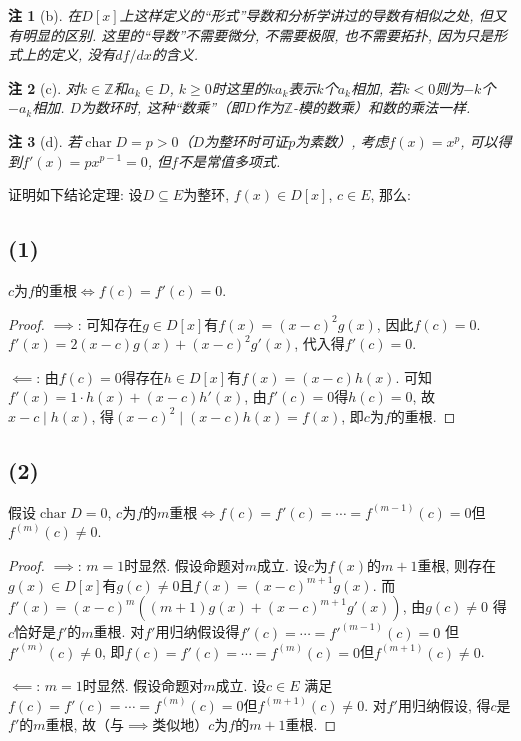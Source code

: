 \documentclass[12pt, a4paper, fontset=windows]{ctexart}
\newcommand{\Z}{\mathbb{Z}}
\newcommand{\ch}{\operatorname{char}}
\newcommand{\kh}[1]{（{#1}）} %
\newcommand{\yh}[1]{“{#1}”} %
\newtheorem*{remark}{注}
\begin{document}
\begin{remark}[b]
在$D[x]$上这样定义的\yh{形式}导数和分析学讲过的导数有相似之处, 
但又有明显的区别. 这里的\yh{导数}不需要微分, 不需要极限, 
也不需要拓扑, 因为只是形式上的定义, 没有$df/dx$的含义. 
\end{remark}

\begin{remark}[c]
对$k\in\Z$和$a_k\in D$, $k\ge 0$时这里的$ka_k$表示$k$个$a_k$相加, 
若$k<0$则为$-k$个$-a_k$相加. $D$为数环时, 这种\yh{数乘}\kh{即$D$作为$\Z$-模的数乘}和数的乘法一样. 
\end{remark}

\begin{remark}[d]
若$\ch D=p>0$\kh{$D$为整环时可证$p$为素数}, 
考虑$f(x)=x^p$, 可以得到$f'(x)=px^{p-1}=0$, 但$f$不是常值多项式. 
\end{remark}

\vspace{2em}

证明如下结论定理: 设$D\subseteq E$为整环, $f(x)\in D[x]$, 
$c\in E$, 那么: 
\subsection*{(1)}

$c$为$f$的重根$\iff f(c)=f'(c)=0$. 

\begin{proof}
$\implies$: 可知存在$g\in D[x]$有$f(x)=(x-c)^2g(x)$, 
因此$f(c)=0$. $f'(x)=2(x-c)g(x)+(x-c)^2g'(x)$, 代入得$f'(c)=0$. 

$\impliedby$: 由$f(c)=0$得存在$h\in D[x]$有$f(x)=(x-c)h(x)$. 
可知$f'(x)=1\cdot h(x)+(x-c)h'(x)$, 由$f'(c)=0$得$h(c)=0$, 
故$x-c\mid h(x)$, 得$(x-c)^2\mid(x-c)h(x)=f(x)$, 即$c$为$f$的重根. 
\end{proof}

\subsection*{(2)}

假设$\ch D=0$, $c$为$f$的$m$重根$\iff f(c)=f'(c)=\cdots=f^{(m-1)}(c)=0$但$f^{(m)}(c)\ne 0$. 

\begin{proof}
$\implies$: $m=1$时显然. 假设命题对$m$成立. 设$c$为$f(x)$的$m+1$重根, 
则存在$g(x)\in D[x]$有$g(c)\ne 0$且$f(x)=(x-c)^{m+1}g(x)$. 
而$f'(x)=(x-c)^m((m+1)g(x)+(x-c)^{m+1}g'(x))$, 由$g(c)\ne 0$
得$c$恰好是$f'$的$m$重根. 对$f'$用归纳假设得$f'(c)=\cdots=f'^{(m-1)}(c)=0$
但$f'^{(m)}(c)\ne 0$, 即$f(c)=f'(c)=\cdots=f^{(m)}(c)=0$但$f^{(m+1)}(c)\ne 0$. 

$\impliedby$: $m=1$时显然. 假设命题对$m$成立. 设$c\in E$
满足$f(c)=f'(c)=\cdots=f^{(m)}(c)=0$但$f^{(m+1)}(c)\ne 0$. 
对$f'$用归纳假设, 得$c$是$f'$的$m$重根, 
故\kh{与$\implies$类似地}$c$为$f$的$m+1$重根. 
\end{proof}
\end{document}
